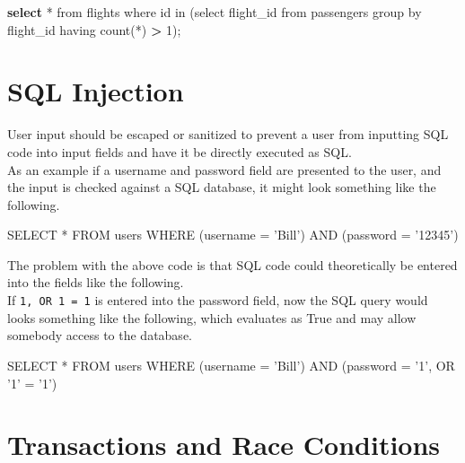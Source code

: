 \documentclass[]{book}
\newenvironment{Shaded}{\begin{snugshade}}{\end{snugshade}}
\newcommand{\KeywordTok}[1]{\textcolor[rgb]{0.13,0.29,0.53}{\textbf{#1}}}
\newcommand{\StringTok}[1]{\textcolor[rgb]{0.31,0.60,0.02}{#1}}
\newcommand{\OperatorTok}[1]{\textcolor[rgb]{0.81,0.36,0.00}{\textbf{#1}}}
\newcommand{\ExtensionTok}[1]{#1}
\newcommand{\NormalTok}[1]{#1}
\begin{document}
\begin{Shaded}
\begin{Highlighting}[]
\KeywordTok{select} \ExtensionTok{*}\NormalTok{ from flights where id in (select flight_id from passengers group by flight_id having count(*) }\OperatorTok{>} \ExtensionTok{1}\NormalTok{);}
\end{Highlighting}
\end{Shaded}

\section{SQL Injection}\label{sql-injection}

User input should be escaped or sanitized to prevent a user from
inputting SQL code into input fields and have it be directly executed as
SQL.\\
As an example if a username and password field are presented to the
user, and the input is checked against a SQL database, it might look
something like the following.

\begin{Shaded}
\begin{Highlighting}[]
\ExtensionTok{SELECT}\NormalTok{ * FROM users WHERE (username = }\StringTok{'Bill'}\NormalTok{) }\ExtensionTok{AND}\NormalTok{ (password = }\StringTok{'12345'}\NormalTok{)}
\end{Highlighting}
\end{Shaded}

The problem with the above code is that SQL code could theoretically be
entered into the fields like the following.\\
If
\texttt{1\textquotesingle{},\ OR\ \textquotesingle{}1\textquotesingle{}\ =\ \textquotesingle{}1\textquotesingle{}}
is entered into the password field, now the SQL query would looks
something like the following, which evaluates as True and may allow
somebody access to the database.

\begin{Shaded}
\begin{Highlighting}[]
\ExtensionTok{SELECT}\NormalTok{ * FROM users WHERE (username = }\StringTok{'Bill'}\NormalTok{) }\ExtensionTok{AND}\NormalTok{ (password = }\StringTok{'1'}\NormalTok{, OR }\StringTok{'1'}\NormalTok{ = }\StringTok{'1'}\NormalTok{)}
\end{Highlighting}
\end{Shaded}

\section{Transactions and Race
Conditions}\label{transactions-and-race-conditions}
\end{document}

